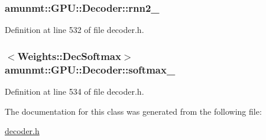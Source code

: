 \subsubsection[{\texorpdfstring{rnn2\+\_\+}{rnn2_}}]{ amunmt\+::\+G\+P\+U\+::\+Decoder\+::rnn2\+\_\+\hspace{0.3cm}{\ttfamily [private]}}\hypertarget{classamunmt_1_1GPU_1_1Decoder_a45258c2a114feb9570202953371256b4}{}\label{classamunmt_1_1GPU_1_1Decoder_a45258c2a114feb9570202953371256b4}


Definition at line 532 of file decoder.\+h.

\subsubsection[{\texorpdfstring{softmax\+\_\+}{softmax_}}]{$<${\bf Weights\+::\+Dec\+Softmax}$>$ amunmt\+::\+G\+P\+U\+::\+Decoder\+::softmax\+\_\+\hspace{0.3cm}{\ttfamily [private]}}\hypertarget{classamunmt_1_1GPU_1_1Decoder_a355dd095e5d8da90692e31b8b3475fd8}{}\label{classamunmt_1_1GPU_1_1Decoder_a355dd095e5d8da90692e31b8b3475fd8}


Definition at line 534 of file decoder.\+h.



The documentation for this class was generated from the following file\+:\begin{DoxyCompactItemize}
\item 
\hyperlink{decoder_8h}{decoder.\+h}\end{DoxyCompactItemize}
